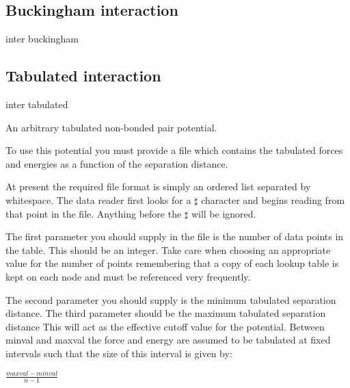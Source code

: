 \subsection{Buckingham interaction}

\begin{essyntax}
  inter   buckingham
     
    
\end{essyntax}

\subsection{Tabulated interaction}

\begin{essyntax}
  inter   tabulated %
  \begin{features}
  \end{features}
\end{essyntax}

An arbitrary tabulated non-bonded pair potential.

To use this potential you must provide a file which contains the
tabulated forces and energies as a function of the separation
distance.

At present the required file format is simply an ordered list
separated by whitespace. The data reader first looks for a $\sharp$
character and begins reading from that point in the file. Anything
before the $\sharp$ will be ignored.

The first parameter you should supply in the file is the number of
data points in the table. This should be an integer. Take care when
choosing an appropriate value for the number of points remembering
that a copy of each lookup table is kept on each node and must be
referenced very frequently.

The second parameter you should supply is the minimum tabulated
separation distance. The third parameter should be the maximum
tabulated separation distance This will act as the effective cutoff
value for the potential. Between minval and maxval the force and
energy are assumed to be tabulated at fixed intervals such that the
size of this interval is given by:

$\frac{maxval-minval}{n-1}$

